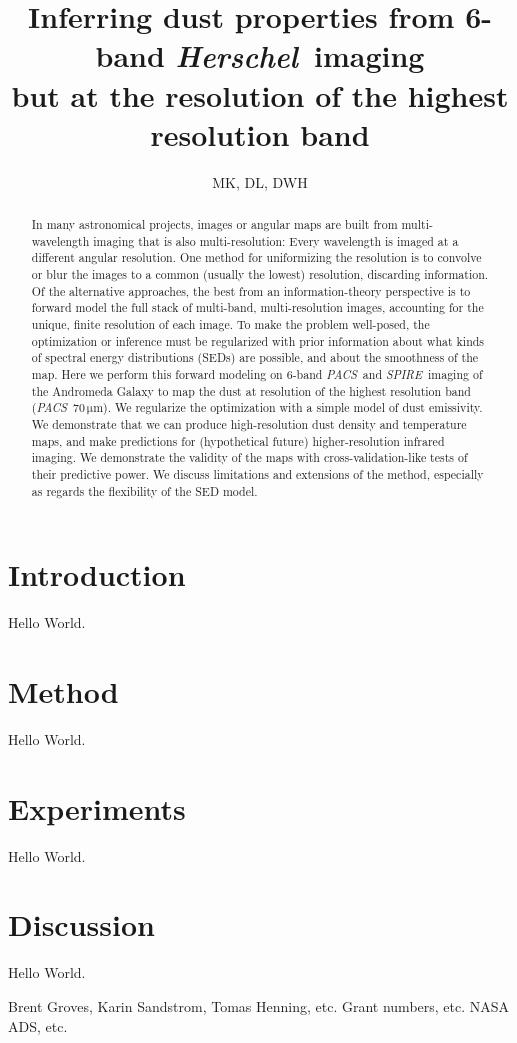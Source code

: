 \documentclass[12pt, preprint]{aastex}
\newcommand{\project}[1]{\textsl{#1}}
\newcommand{\Herschel}{\project{Herschel}}
\newcommand{\acronym}[1]{{\small{#1}}}
\newcommand{\PACS}{\project{\acronym{PACS}}}
\newcommand{\SPIRE}{\project{\acronym{SPIRE}}}
\newcommand{\unit}[1]{{\mathrm{#1}}}
\newcommand{\mum}{\unit{\mu m}}
\begin{document}
\title{Inferring dust properties from 6-band \Herschel\ imaging \\ 
       but at the resolution of the highest resolution band}
\author{MK, DL, DWH}

\begin{abstract}
In many astronomical projects, images or angular maps are built from
multi-wavelength imaging that is also multi-resolution:
Every wavelength is imaged at a different angular resolution.
One method for uniformizing the resolution is to convolve or blur the
images to a common (usually the lowest) resolution, discarding
information.
Of the alternative approaches, the best from an information-theory
perspective is to forward model the full stack of multi-band,
multi-resolution images, accounting for the unique, finite resolution
of each image.
To make the problem well-posed, the optimization or inference must be
regularized with prior information about what kinds of spectral energy
distributions (\acronym{SED}s) are possible, and about the smoothness of the map.
Here we perform this forward modeling on 6-band \PACS\ and
\SPIRE\ imaging of the Andromeda Galaxy to map the dust at resolution
of the highest resolution band (\PACS~$70\,\mum$).
We regularize the optimization with a simple model of dust emissivity.
We demonstrate that we can produce high-resolution dust density and
temperature maps, and make predictions for (hypothetical future)
higher-resolution infrared imaging.
We demonstrate the validity of the maps with cross-validation-like
tests of their predictive power.
We discuss limitations and extensions of the method, especially as
regards the flexibility of the \acronym{SED} model.
\end{abstract}

\section{Introduction}

Hello World.

\section{Method}

Hello World.

\section{Experiments}

Hello World.

\section{Discussion}

Hello World.

\acknowledgements
Brent Groves, Karin Sandstrom, Tomas Henning, etc.
Grant numbers, etc.
\acronym{NASA ADS}, etc.
\end{document}
